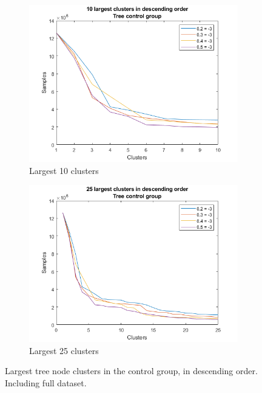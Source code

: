 \begin{figure}
    \centering
    \begin{subfigure}[b]{.45\textwidth}
        \centering
        \includegraphics[width=\textwidth]{figures/treecontrolcluster10.png}
        \caption{Largest 10 clusters}
        \label{sfig:tree:treecontrolcluster10}
    \end{subfigure}
    \hfill
    \begin{subfigure}[b]{.45\textwidth}
        \centering
        \includegraphics[width=\textwidth]{figures/treecontrolcluster25.png}
        \caption{Largest 25 clusters}
        \label{sfig:tree:treecontrolcluster25}
    \end{subfigure}
    \caption{Largest tree node clusters in the control group, in descending order. Including full dataset.}
    \label{fig:tree:treecontrolcluster}
\end{figure}

